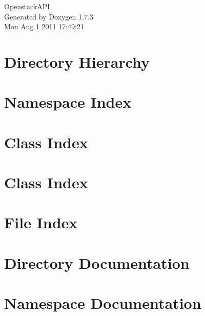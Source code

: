 \documentclass[a4paper]{book}
\begin{document}
\hypersetup{pageanchor=false}
\begin{titlepage}
\vspace*{7cm}
\begin{center}
{\Large OpenstackAPI }\\
\vspace*{1cm}
{\large Generated by Doxygen 1.7.3}\\
\vspace*{0.5cm}
{\small Mon Aug 1 2011 17:49:21}\\
\end{center}
\end{titlepage}
\clearemptydoublepage
{}
\tableofcontents
\clearemptydoublepage
{}
\hypersetup{pageanchor=true}
\chapter{Directory Hierarchy}

\chapter{Namespace Index}

\chapter{Class Index}

\chapter{Class Index}

\chapter{File Index}

\chapter{Directory Documentation}





\chapter{Namespace Documentation}



\end{document}
